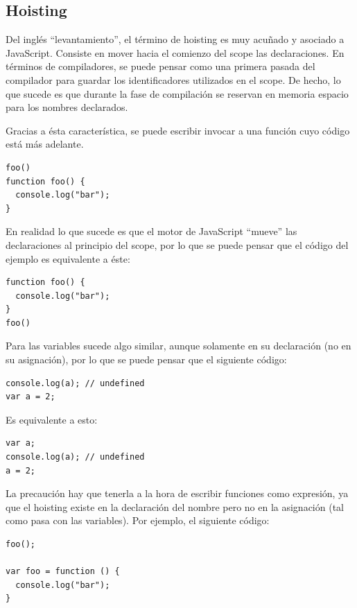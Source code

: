 \subsection{Hoisting}
\label{sec:hoisting}

Del inglés "`levantamiento"', el término de hoisting es muy acuñado y asociado a JavaScript. Consiste en mover hacia el comienzo del scope las declaraciones. En términos de compiladores, se puede pensar como una primera pasada del compilador para guardar los identificadores utilizados en el scope. De hecho, lo que sucede es que durante la fase de compilación se reservan en memoria espacio para los nombres declarados.

Gracias a ésta característica, se puede escribir invocar a una función cuyo código está más adelante.

\begin{lstlisting}
foo()
function foo() {
  console.log("bar");
}
\end{lstlisting}

En realidad lo que sucede es que el motor de JavaScript "`mueve"' las declaraciones al principio del scope, por lo que se puede pensar que el código del ejemplo es equivalente a éste:

\begin{lstlisting}
function foo() {
  console.log("bar");
}
foo()
\end{lstlisting}

Para las variables sucede algo similar, aunque solamente en su declaración (no en su asignación), por lo que se puede pensar que el siguiente código:

\begin{lstlisting}
console.log(a); // undefined
var a = 2;
\end{lstlisting}

Es equivalente a esto:

\begin{lstlisting}
var a;
console.log(a);	// undefined
a = 2;
\end{lstlisting}

La precaución hay que tenerla a la hora de escribir funciones como expresión, ya que el hoisting existe en la declaración del nombre pero no en la asignación (tal como pasa con las variables). Por ejemplo, el siguiente código:

\begin{lstlisting}
foo();

var foo = function () { 
  console.log("bar");
}
\end{lstlisting}

